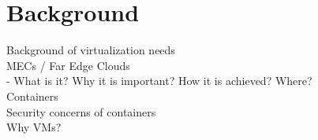 \chapter{Background}
\label{chapter:background}

Background of virtualization needs \\
MECs / Far Edge Clouds \\
    - What is it? Why it is important? How it is achieved? Where? \\
Containers \\
Security concerns of containers \\
Why VMs? \\



